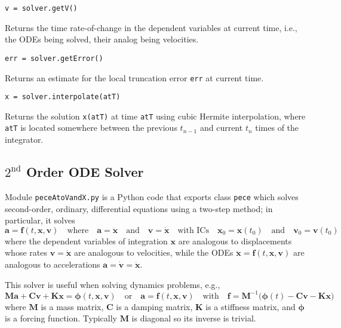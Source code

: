 \medskip\noindent
\texttt{v = solver.getV()} 

\medskip\noindent
Returns the time rate-of-change in the dependent variables at current time, i.e., the ODEs being solved, their analog being velocities.

\medskip\noindent
\texttt{err = solver.getError()} 

\medskip\noindent
Returns an estimate for the local truncation error \texttt{err} at current time.

\medskip\noindent
\texttt{x = solver.interpolate(atT)}

\medskip\noindent
Returns the solution \texttt{x(atT)} at time \texttt{atT} using cubic Hermite interpolation, where \texttt{atT} is located somewhere between the previous $t_{n-1}$ and current $t_n$ times of the integrator.

\subsection{$\mathit{2}^{\text{nd}}$ Order ODE Solver}
\label{app2ndOrderODEs}

Module \texttt{peceAtoVandX.py} is a Python code that exports class \texttt{pece} which solves second-order, ordinary, differential equations using a two-step method; in particular, it solves
\begin{displaymath}
\mathbf{a} = \mathbf{f}(t,\mathbf{x},\mathbf{v}) 
\quad \text{where} \quad
\mathbf{a} = \ddot{\mathbf{x}}
\quad \text{and} \quad
\mathbf{v} = \dot{\mathbf{x}}
\quad \text{with ICs} \quad
\mathbf{x}_0 = \mathbf{x}(t_0)
\quad \text{and} \quad 
\mathbf{v}_0 = \mathbf{v}(t_0)
\end{displaymath}
where the dependent variables of integration $\mathbf{x}$ are analogous to displacements whose rates $\mathbf{v} = \dot{\mathbf{x}}$ are analogous to velocities, while the ODEs $\ddot{\mathbf{x}} = \mathbf{f}(t, \mathbf{x}, \mathbf{v})$ are analogous to accelerations $\mathbf{a} = \dot{\mathbf{v}} = \ddot{\mathbf{x}}$.  

This solver is useful when solving dynamics problems, e.g.,
\begin{displaymath}
    \mathbf{M} \mathbf{a} + \mathbf{C} \mathbf{v} + \mathbf{K} \mathbf{x} =
    \boldsymbol{\phi} (t, \mathbf{x}, \mathbf{v} )
    \quad \text{or} \quad
    \mathbf{a} = \mathbf{f} (t, \mathbf{x}, \mathbf{v}) 
    \quad \text{with} \quad
    \mathbf{f} = \mathbf{M}^{-1} \bigl( \boldsymbol{\phi}(t) - \mathbf{C} \mathbf{v} - \mathbf{K} \mathbf{x} \bigr)
\end{displaymath}
where $\mathbf{M}$ is a mass matrix, $\mathbf{C}$ is a damping matrix, $\mathbf{K}$ is a stiffness matrix, and $\boldsymbol{\phi}$ is a forcing function.  Typically $\mathbf{M}$ is diagonal so its inverse is trivial.

